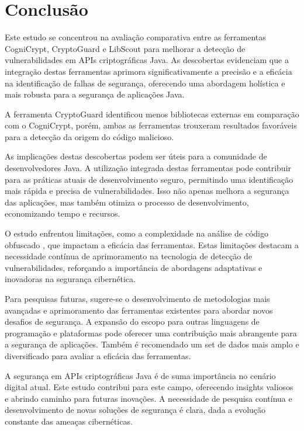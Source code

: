 \section{Conclusão}

Este estudo se concentrou na avaliação comparativa entre as ferramentas CogniCrypt, CryptoGuard e LibScout para melhorar a detecção de vulnerabilidades em APIs criptográficas Java. As descobertas evidenciam que a integração destas ferramentas aprimora significativamente a precisão e a eficácia na identificação de falhas de segurança, oferecendo uma abordagem holística e mais robusta para a segurança de aplicações Java.

A ferramenta CryptoGuard identificou menos bibliotecas externas em comparação com o CogniCrypt, porém, ambas as ferramentas trouxeram resultados favoráveis para a detecção da origem do código malicioso. 

As implicações destas descobertas podem ser úteis para a comunidade de desenvolvedores Java. A utilização integrada destas ferramentas pode contribuir para as práticas atuais de desenvolvimento seguro, permitindo uma identificação mais rápida e precisa de vulnerabilidades. Isso não apenas melhora a segurança das aplicações, mas também otimiza o processo de desenvolvimento, economizando tempo e recursos. \cite{perception_developers}

O estudo enfrentou limitações, como a complexidade na análise de código obfuscado \cite{api_misuses_zhang}, que impactam a eficácia das ferramentas. Estas limitações destacam a necessidade contínua de aprimoramento na tecnologia de detecção de vulnerabilidades, reforçando a importância de abordagens adaptativas e inovadoras na segurança cibernética.

Para pesquisas futuras, sugere-se o desenvolvimento de metodologias mais avançadas e aprimoramento das ferramentas existentes para abordar novos desafios de segurança. A expansão do escopo para outras linguagens de programação e plataformas pode oferecer uma contribuição mais abrangente para a segurança de aplicações. Também é recomendado um set de dados mais amplo e diversificado para avaliar a eficácia das ferramentas.

A segurança em APIs criptográficas Java é de suma importância no cenário digital atual. Este estudo contribui para este campo, oferecendo insights valiosos e abrindo caminho para futuras inovações. A necessidade de pesquisa contínua e desenvolvimento de novas soluções de segurança é clara, dada a evolução constante das ameaças cibernéticas.
